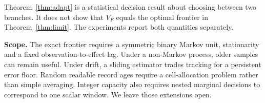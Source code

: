 Theorem~\ref{thm:adapt} is a statistical decision result about choosing between
two branches. It does not show that $V_F$ equals the optimal frontier in
Theorem~\ref{thm:limit}. The experiments report both quantities separately.

\noindent\textbf{Scope.}
The exact frontier requires a symmetric binary Markov unit, stationarity and a
fixed observation-to-effect lag. Under a non-Markov process, older samples can
remain useful. Under drift, a sliding estimator trades tracking for a persistent
error floor. Random readable record ages require a cell-allocation problem rather
than simple averaging. Integer capacity also requires nested marginal decisions
to correspond to one scalar window. We leave those extensions open.

